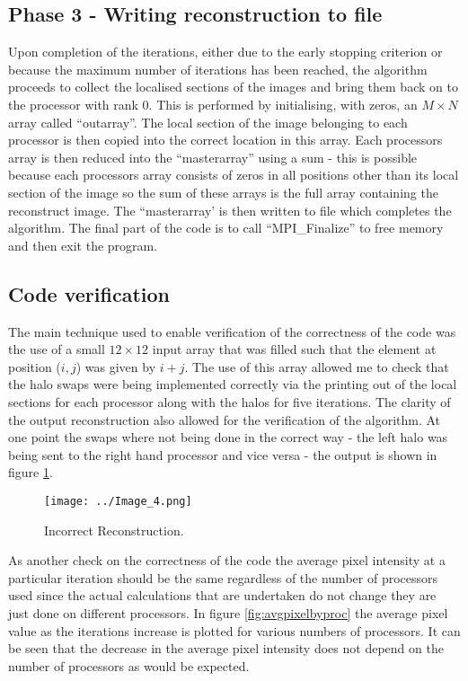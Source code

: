 \documentclass[12pt]{article}
\begin{document}
\subsection{Phase 3 - Writing reconstruction to file}   
Upon completion of the iterations, either due to the early stopping criterion or because the maximum number of iterations has been reached, the algorithm proceeds to collect the localised sections of the images and bring them back on to the processor with rank 0. This is performed by initialising, with zeros, an $M\times N$ array called ``outarray''. The local section of the image belonging to each processor is then copied into the correct location in this array. Each processors array is then reduced into the ``masterarray'' using a sum - this is possible because each processors array consists of zeros in all positions other than its local section of the image so the sum of these arrays is the full array containing the reconstruct image. The ``masterarray' is then written to file which completes the algorithm. The final part of the code is to call ``MPI\_Finalize'' to free memory and then exit the program.
\subsection{Code verification}
The main technique used to enable verification of the correctness of the code was the use of a small $12\times12$ input array that was filled such that the element at position ($i,j$) was given by $i+j$. The use of this array allowed me to check that the halo swaps were being implemented correctly via the printing out of the local sections for each processor along with the halos for five iterations. The clarity of the output reconstruction also allowed for the verification of the algorithm. At one point the swaps where not being done in the correct way - the left halo was being sent to the right hand processor and vice versa - the output is shown in figure \ref{fig:Incorrect}.

\begin{figure}[H]
        \centering
        \texttt{[image: ../Image\_4.png]}
        \caption{Incorrect Reconstruction.}\label{fig:Incorrect}
\end{figure}

As another check on the correctness of the code the average pixel intensity at a particular iteration should be the same regardless of the number of processors used since the actual calculations that are undertaken do not change they are just done on different processors. In figure \ref{fig:avgpixelbyproc} the average pixel value as the iterations increase is plotted for various numbers of processors. It can be seen that the decrease in the average pixel intensity does not depend on the number of processors as would be expected.
\end{document}
